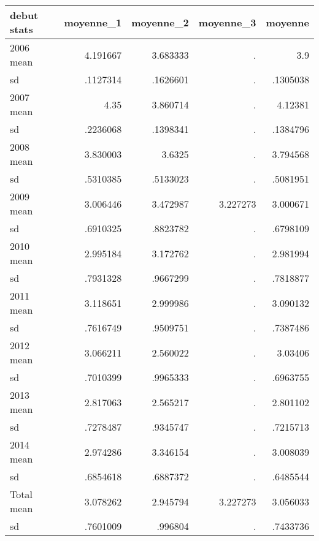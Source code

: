 \begin{center}
\begin{tabular} {@{} l r r r r @{}} \\ \hline
\textbf{debut       stats } & \textbf{  moyenne\_1} & \textbf{  moyenne\_2} & \textbf{  moyenne\_3} & \textbf{   moyenne} \\
\hline
2006         mean  &   4.191667 &   3.683333 &          . &        3.9 \\
               sd  &   .1127314 &   .1626601 &          . &   .1305038 \\
2007         mean  &       4.35 &   3.860714 &          . &    4.12381 \\
               sd  &   .2236068 &   .1398341 &          . &   .1384796 \\
2008         mean  &   3.830003 &     3.6325 &          . &   3.794568 \\
               sd  &   .5310385 &   .5133023 &          . &   .5081951 \\
2009         mean  &   3.006446 &   3.472987 &   3.227273 &   3.000671 \\
               sd  &   .6910325 &   .8823782 &          . &   .6798109 \\
2010         mean  &   2.995184 &   3.172762 &          . &   2.981994 \\
               sd  &   .7931328 &   .9667299 &          . &   .7818877 \\
2011         mean  &   3.118651 &   2.999986 &          . &   3.090132 \\
               sd  &   .7616749 &   .9509751 &          . &   .7387486 \\
2012         mean  &   3.066211 &   2.560022 &          . &    3.03406 \\
               sd  &   .7010399 &   .9965333 &          . &   .6963755 \\
2013         mean  &   2.817063 &   2.565217 &          . &   2.801102 \\
               sd  &   .7278487 &   .9345747 &          . &   .7215713 \\
2014         mean  &   2.974286 &   3.346154 &          . &   3.008039 \\
               sd  &   .6854618 &   .6887372 &          . &   .6485544 \\
Total        mean  &   3.078262 &   2.945794 &   3.227273 &   3.056033 \\
               sd  &   .7601009 &    .996804 &          . &   .7433736 \\
\hline
\end{tabular}
\end{center}
